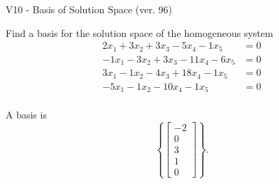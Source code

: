 \begin{exercise}
  \begin{exerciseTitle}V10 - Basis of Solution Space (ver. 96)\end{exerciseTitle}
  \begin{exerciseStatement}
    Find a basis for the solution space of the homogeneous system 
\begin{align*}
 2 x_ 1 + 3 x_ 2 + 3 x_ 3 -5 x_ 4 -1 x_ 5 &= 0  \\ 
  -1 x_ 1 -3 x_ 2 + 3 x_ 3 -11 x_ 4 -6 x_ 5 &= 0  \\ 
  3 x_ 1 -1 x_ 2 -4 x_ 3 + 18 x_ 4 -1 x_ 5 &= 0  \\ 
  -5 x_ 1 -1 x_ 2 -10 x_ 4 -1 x_ 5 &= 0  \\ 
 \end{align*}


 
  \end{exerciseStatement}

  \begin{exerciseAnswer}
   A basis is   
\[\left\{\left[\begin{array}{c}
-2 \\
0 \\
3 \\
1 \\
0
\end{array}\right]\right\}.\]

  


  \end{exerciseAnswer}
\end{exercise}